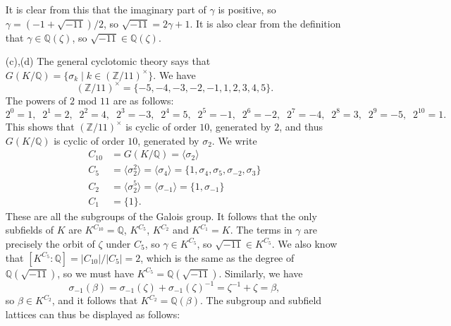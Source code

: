 \documentclass{amsart}
\newcommand{\Z}         {{\mathbb{Z}}}
\newcommand{\Q}         {{\mathbb{Q}}}
\newcommand{\bt}        {\beta}
\newcommand{\gm}        {\gamma}
\newcommand{\zt}        {\zeta}
\newcommand{\sg}        {\sigma}
\newcommand{\st}        {\;|\;}
\newcommand{\tm}        {\times}
\newcommand{\ip}[1]     {\langle #1\rangle}
\renewcommand{\:}{\colon}
\newenvironment{solution}{\SolutionInline}{\endSolutionInline}
\theoremstyle{definition}
\renewenvironment{solution}{\SolutionAtEnd}{\endSolutionAtEnd}
\begin{document}
\begin{solution}
\begin{itemize}
\begin{center}
   \end{center}
   It is clear from this that the imaginary part of $\gm$ is positive,
   so $\gm=(-1+\sqrt{-11})/2$, so $\sqrt{-11}=2\gm+1$.  It is also
   clear from the definition that $\gm\in\Q(\zt)$, so
   $\sqrt{-11}\in\Q(\zt)$.  
  \item[(c),(d)] The general cyclotomic theory says that
   $G(K/\Q)=\{\sg_k\st k\in(\Z/11)^\tm\}$.  We have 
   \[ (\Z/11)^\tm = 
       \{-5,-4,-3,-2,-1,1,2,3,4,5\}.
   \]
   The powers of $2$ mod $11$ are as follows:
   \[ 2^0=1,  \;\;
      2^1=2,  \;\;
      2^2=4,  \;\;
      2^3=-3, \;\;
      2^4=5,  \;\;
      2^5=-1, \;\;
      2^6=-2, \;\;
      2^7=-4, \;\;
      2^8=3,  \;\;
      2^9=-5, \;\;
      2^{10}=1.
   \]
   This shows that $(\Z/11)^\tm$ is cyclic of order $10$, generated
   by $2$, and thus $G(K/\Q)$ is cyclic of order $10$, generated by
   $\sg_2$.  We write 
   \begin{align*}
    C_{10} &= G(K/\Q) = \ip{\sg_2} \\
    C_5 &= \ip{\sg_2^2} = \ip{\sg_4} = 
      \{1,\sg_4,\sg_5,\sg_{-2},\sg_3\} \\
    C_2 &= \ip{\sg_2^5} = \ip{\sg_{-1}} = \{1,\sg_{-1}\} \\
    C_1 &= \{1\}.
   \end{align*}
   These are all the subgroups of the Galois group.  It follows that
   the only subfields of $K$ are $K^{C_{10}}=\Q$, $K^{C_5}$, $K^{C_2}$
   and $K^{C_1}=K$.  The terms in $\gm$ are precisely the orbit of
   $\zt$ under $C_5$, so $\gm\in K^{C_5}$, so $\sqrt{-11}\in K^{C_5}$.
   We also know that $[K^{C_5}:\Q]=|C_{10}|/|C_5|=2$, which is the
   same as the degree of $\Q(\sqrt{-11})$, so we must have
   $K^{C_5}=\Q(\sqrt{-11})$.  Similarly, we have
   \[ \sg_{-1}(\bt) = 
      \sg_{-1}(\zt)+\sg_{-1}(\zt)^{-1}=\zt^{-1}+\zt=\bt, 
   \]
   so $\bt\in K^{C_2}$, and it follows that $K^{C_2}=\Q(\bt)$.  The
   subgroup and subfield lattices can thus be displayed as follows:
   \begin{center}
\end{center}
\end{itemize}
\end{solution}
\end{document}
